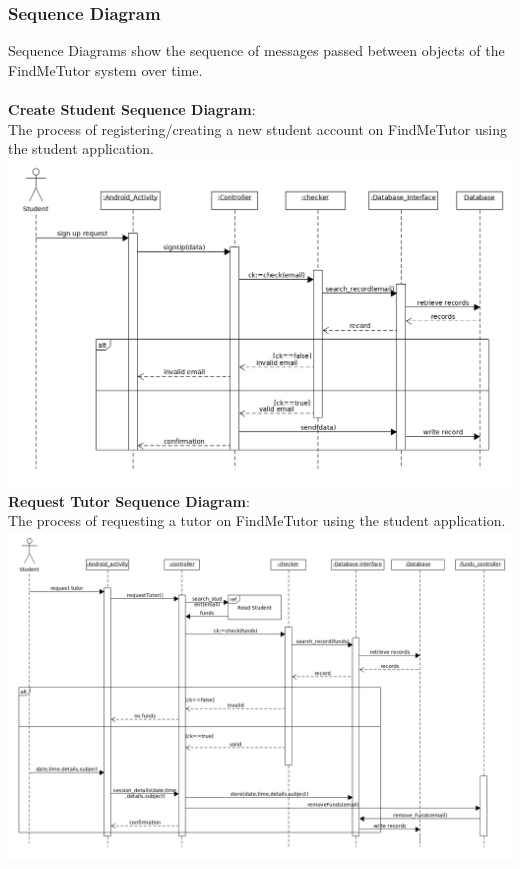 \documentclass[12pt]{article}
\begin{document}
\subsubsection{Sequence Diagram}
Sequence Diagrams show the sequence of messages passed between objects of the FindMeTutor system over time.\\
\\\textbf{Create Student Sequence Diagram}:\\
The process of registering/creating a new student account on FindMeTutor using the student application.\\
\includegraphics[width=140mm]{./sequence_diagram/create_student.png}
\newpage
\textbf{Request Tutor Sequence Diagram}:\\
The process of requesting a tutor on FindMeTutor using the student application.\\
\includegraphics[width=140mm]{./sequence_diagram/request_tutor.png}
\end{document}
